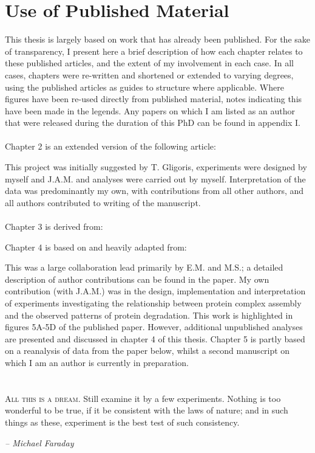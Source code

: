 \documentclass[a4paper,11pt,twoside,openright]{scrbook}
\begin{document}
\chapter*{Use of Published Material}
This thesis is largely based on work that has already been published. For the sake of transparency, I present here a brief description of how each chapter relates to these published articles, and the extent of my involvement in each case. In all cases, chapters were re-written and shortened or extended to varying degrees, using the published articles as guides to structure where applicable. Where figures have been re-used directly from published material, notes indicating this have been made in the legends. Any papers on which I am listed as an author that were released during the duration of this PhD can be found in appendix I.
\\~\\
Chapter 2 is an extended version of the following article:
\begin{quote}
\end{quote}
This project was initially suggested by T. Gligoris, experiments were designed by myself and J.A.M. and analyses were carried out by myself. Interpretation of the data was predominantly my own, with contributions from all other authors, and all authors contributed to writing of the manuscript.
\\~\\
Chapter 3 is derived from:
\begin{quote}
\end{quote}
Chapter 4 is based on and heavily adapted from:
\begin{quote}
\end{quote}
This was a large collaboration lead primarily by E.M. and M.S.; a detailed description of author contributions can be found in the paper. My own contribution (with J.A.M.) was in the design, implementation and interpretation of experiments investigating the relationship between protein complex assembly and the observed patterns of protein degradation. This work is highlighted in figures 5A-5D of the published paper. However, additional unpublished analyses are presented and discussed in chapter 4 of this thesis.
Chapter 5 is partly based on a reanalysis of data from the paper below, whilst a second manuscript on which I am an author is currently in preparation.

\chapter*{}
\setlength{\epigraphwidth}{.45\textwidth}
\setlength{\epigraphrule}{0pt}
\epigraph{\textsc{All this is a dream}. Still examine it by a few experiments. Nothing is too wonderful to be true, if it be consistent with the laws of nature; and in such things as these, experiment is the best test of such consistency.}{\textit{-- Michael Faraday}}
\end{document}
